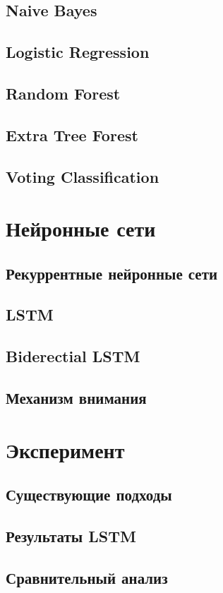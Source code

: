     \subsection{Naive Bayes}
    \subsection{Logistic Regression}
    \subsection{Random Forest}
    \subsection{Extra Tree Forest}
    \subsection{Voting Classification}
\clearpage

\section{Нейронные сети}
    \subsection{Рекуррентные нейронные сети}
    \subsection{LSTM}
    \subsection{Biderectial LSTM}
    \subsection{Механизм внимания}
\clearpage

\section{Эксперимент}
    \subsection{Существующие подходы}\label{be_class_exp}
    \subsection{Результаты LSTM}\label{lstm_class_exp}
    \subsection{Сравнительный анализ}
\clearpage